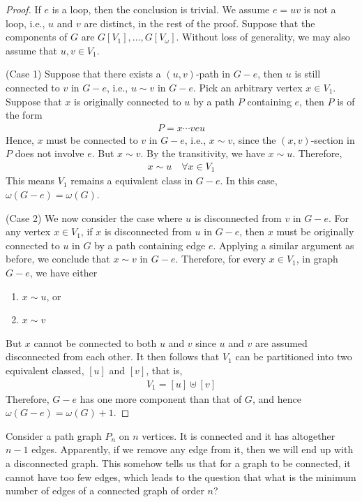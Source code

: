 \documentclass[thmcnt=section, 12pt, color=cyan]{my-elegantbook}
\begin{document}
\begin{proof}
	If $e$ is a loop, then the conclusion is trivial. 
	We assume $e = uv$ is not a loop, i.e., 
	$u$ and  $v$ are distinct,
	in the rest of the proof. 
	Suppose that the components of $G$
	are  $G[V_1], \ldots, G[V_\omega]$.
	Without loss of generality, 
	we may also assume that $u, v \in V_1$.

	(Case 1) Suppose that there exists a $(u,v)$-path in $G-e$,
	then $u$ is still connected to $v$ in $G-e$,
	i.e., $u \sim v$ in $G-e$.
	Pick an arbitrary vertex $x \in V_1$.
	Suppose that $x$ is originally connected to $u$ 
	by a path $P$ containing $e$,
	then $P$ is of the form 
	\begin{align*}
	    P = x \cdots v e u
	\end{align*}
	Hence, $x$ must be connected to $v$ in $G-e$,
	i.e., $x \sim v$, 
	since the $(x,v)$-section 
	in $P$ does not involve  $e$.
	But $x \sim v$. 
	By the transitivity, we have $x \sim u$. 
	Therefore, 
	\begin{align*}
		x \sim u 
		\quad \forall x \in V_1
	\end{align*}
	This means $V_1$ remains a equivalent class in  $G-e$.
	In this case,  $\omega(G-e) = \omega(G)$.

	(Case 2) We now consider the case where 
	$u$ is disconnected from  $v$ in $G-e$.
	For any vertex $x \in V_1$,
	if $x$ is disconnected from $u$ in  $G-e$, 
	then $x$ must be originally connected to $u$ in $G$ 
	by a path containing edge $e$.
	Applying a similar argument as before,
	we conclude that $x \sim v$ in $G-e$.
	Therefore, for every  $x \in V_1$, 
	in graph $G-e$, we have either 
	\begin{enumerate}
		\item $x \sim u$, or 
		\item $x \sim v$
	\end{enumerate}
	But $x$ cannot be connected to both  $u$ and  $v$
	since  $u$ and  $v$ are 
	assumed disconnected from each other.
	It then follows that  $V_1$ can be partitioned into
	two equivalent classed, $[u]$ and  $[v]$, that is, 
	\begin{align*}
		V_1 = [u] \uplus [v]
	\end{align*}
	Therefore, $G-e$ has one more component than that of $G$, 
	and hence  $\omega(G-e) = \omega(G) + 1$.
\end{proof}


Consider a path graph $P_n$ on $n$ vertices.
It is connected and it has altogether $n-1$ edges. 
Apparently, if we remove any edge from it, 
then we will end up with a disconnected graph.
This somehow tells us that 
for a graph to be connected,
it cannot have too few edges, 
which leads to the question that 
what is the minimum number of edges 
of a connected graph of order $n$?
\end{document}
